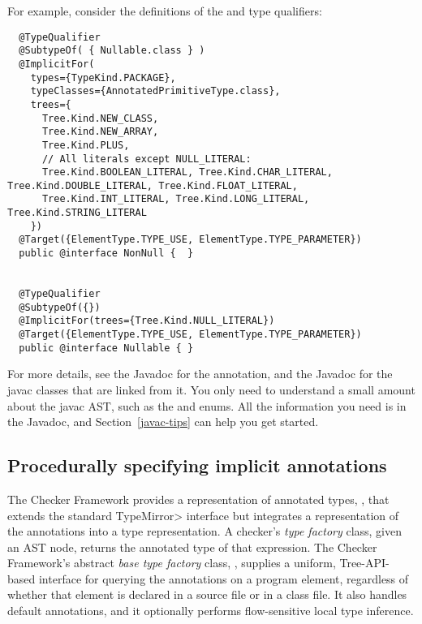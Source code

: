 For example, consider the definitions of the  and 
type qualifiers:

\begin{smaller}
\begin{Verbatim}
  @TypeQualifier
  @SubtypeOf( { Nullable.class } )
  @ImplicitFor(
    types={TypeKind.PACKAGE},
    typeClasses={AnnotatedPrimitiveType.class},
    trees={
      Tree.Kind.NEW_CLASS,
      Tree.Kind.NEW_ARRAY,
      Tree.Kind.PLUS,
      // All literals except NULL_LITERAL:
      Tree.Kind.BOOLEAN_LITERAL, Tree.Kind.CHAR_LITERAL, Tree.Kind.DOUBLE_LITERAL, Tree.Kind.FLOAT_LITERAL,
      Tree.Kind.INT_LITERAL, Tree.Kind.LONG_LITERAL, Tree.Kind.STRING_LITERAL
    })
  @Target({ElementType.TYPE_USE, ElementType.TYPE_PARAMETER})
  public @interface NonNull {  }


  @TypeQualifier
  @SubtypeOf({})
  @ImplicitFor(trees={Tree.Kind.NULL_LITERAL})
  @Target({ElementType.TYPE_USE, ElementType.TYPE_PARAMETER})
  public @interface Nullable { }
\end{Verbatim}
\end{smaller}

For more details, see the Javadoc for the 
  annotation, and the Javadoc for the javac classes that are linked from
it.  You only need to understand a small amount about the javac AST, such
as the
\href{\TreeAPIBase{}/tree/Tree.Kind.html?is-external=true}{}
and
enums.  All the information you need is in the Javadoc, and
Section~\ref{javac-tips} can help you get started.


\subsection{Procedurally specifying implicit annotations\label{procedurally-specifying-implicit-annotations}}


The Checker Framework provides a representation of annotated types,
, that extends the standard \<TypeMirror>
interface but integrates a representation of the annotations into a
type representation.  A checker's \emph{type factory} class, given an AST
node, returns the annotated type of that expression.  The Checker
Framework's abstract
\emph{base type factory} class, ,
supplies a uniform, Tree-API-based interface
for querying the annotations on a program element, regardless of
whether that element is declared in a source file or in a class file.
It also handles default annotations, and it optionally performs
flow-sensitive local type inference.

